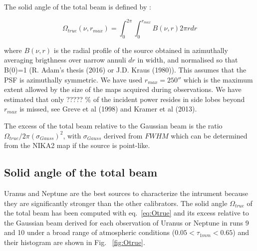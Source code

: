 The solid angle of the total beam is defined by :

\begin{equation}
 \Omega_{true} (\nu,r_{max}) = \int_0^{2\pi} \int_0^{r_{max}} B(\nu, r) 2 \pi r dr
\label{eq:Otrue}
\end{equation}

\noindent where $B(\nu,r)$ is the radial profile of the source obtained in azimuthally averaging brigthness over narrow annuli
$dr$ in width, and normalised so that B(0)=1 (R. Adam's thesis (2016) or J.D. Kraus (1980)).
This assumes that the PSF is azimuthally symmetric. 
We have used $r_{max}=250''$ which is the maximum extent allowed by the size of the maps acquired during observations.
We have estimated that only ????? \%  of the incident power resides in side lobes beyond $r_{max}$ is missed,
see Greve et al (1998) and Kramer et al (2013).

The excess of the total beam relative to the Gaussian beam is the ratio
$\Omega_{true} / 2 \pi (\sigma_{Gauss})^2$, with  $\sigma_{Gauss}$ derived from $FWHM$ which can be determined
from the NIKA2 map if the source is point-like.


\subsection{Solid angle of the total beam}
\label{S:solang}

Uranus and Neptune are the best sources to characterize the intrument because
they are significantly stronger than the other calibrators.                                                               
The solid angle $\Omega_{true}$ of the total beam has been computed with  eq.~\ref{eq:Otrue}
and its excess relative to the Gaussian beam derived
for each  observation of Uranus or Neptune in  runs 9 and 10 under  a broad range of atmospheric conditions
($0.05 < \tau_{1mm} < 0.65$)  and their histogram are shown in Fig. ~\ref{fig:Otrue}.

